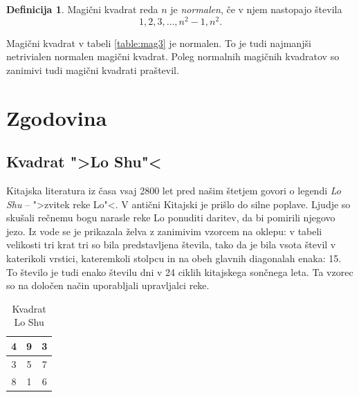 \documentclass[a4paper,12pt]{article}
\newcommand{\pojem}[1]{\emph{\color{purple}#1}}
\newenvironment{magic}[3]
{
   \begin{table}[!ht]
   \centering
   \caption{#2}
   \label{#3}
   \large
   \begin{tabular}{|*{#1}{c|}}
   \hline
}
{
   \end{tabular}
    \normalsize
\end{table}
}
\theoremstyle{definition}
\newtheorem{definicija}{Definicija}
\theoremstyle{plain}
\begin{document}

\begin{definicija}
   Magični kvadrat reda \(n\) je \pojem{normalen}, če v njem nastopajo števila
   \begin{equation}
      \label{eq:numbers}
      1, 2, 3, \ldots, n^2-1, n^2.
   \end{equation}
\end{definicija}

Magični kvadrat v tabeli \ref{table:mag3} je normalen.
To je tudi najmanjši netrivialen normalen magični kvadrat.
Poleg normalnih magičnih kvadratov so zanimivi tudi magični kvadrati praštevil.


\section{Zgodovina}

\subsection{Kvadrat ">Lo Shu"<}

Kitajska literatura iz časa vsaj 2800 let pred našim štetjem govori o legendi
\emph{Lo Shu} -- ">zvitek reke Lo"<. V antični Kitajski je prišlo do
silne poplave. Ljudje so skušali rečnemu bogu narasle reke Lo ponuditi daritev,
da bi pomirili njegovo jezo. Iz vode se je prikazala želva z zanimivim vzorcem
na oklepu: v tabeli velikosti tri krat tri so bila predstavljena števila, tako
da je bila vsota števil v katerikoli vrstici, kateremkoli stolpcu in na obeh
glavnih diagonalah enaka: 15. To število je tudi enako številu dni v 24 ciklih
kitajskega sončnega leta. Ta vzorec so na določen način uporabljali upravljalci
reke.

\begin{magic}{3}{Kvadrat Lo Shu}{table:loshu}
   4 & 9 & 3 \\ \hline
   3 & 5 & 7 \\ \hline
   8 & 1 & 6 \\ \hline
   \end{magic}
\end{document}
